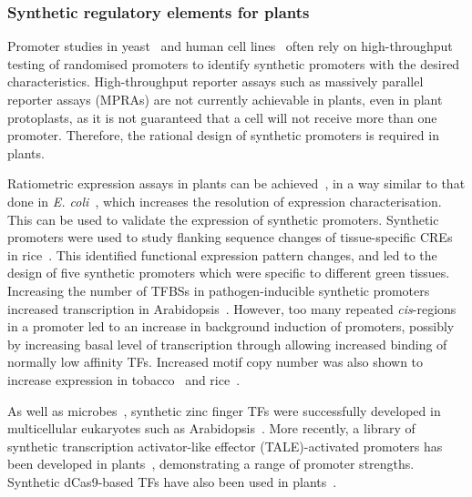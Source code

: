 \documentclass[../main.tex]{subfiles}
\begin{document}
\subsubsection{Synthetic regulatory elements for plants}\label{chapter1:synthetic-regulatory-elements-for-plants}

Promoter studies in yeast~\autocite{reddenDevelopmentCharacterizationSynthetic2015,boerDecipheringEukaryoticGeneregulatory2019,kotopkaModeldrivenGenerationArtificial2020} and human cell lines~\autocite{mattioliHighthroughputFunctionalAnalysis2019} often rely on high\hyp{}throughput testing of randomised promoters to identify synthetic promoters with the desired characteristics.
High\hyp{}throughput reporter assays such as massively parallel reporter assays (MPRAs) are not currently achievable in plants, even in plant protoplasts, as it is not guaranteed that a cell will not receive more than one promoter.
Therefore, the rational design of synthetic promoters is required in plants.

Ratiometric expression assays in plants can be achieved~\autocite{brucknerLibrarySyntheticTranscription2015}, in a way similar to that done in \textit{E. coli}~\autocite{kellyMeasuringActivityBioBrick2009}, which increases the resolution of expression characterisation.
This can be used to validate the expression of synthetic promoters.
Synthetic promoters were used to study flanking sequence changes of tissue\hyp{}specific CREs in rice~\autocite{wangNovelGreenTissuespecific2015}.
This identified functional expression pattern changes, and led to the design of five synthetic promoters which were specific to different
green tissues.
Increasing the number of TFBSs in pathogen\hyp{}inducible synthetic promoters increased transcription in Arabidopsis~\autocite{rushtonSyntheticPlantPromoters2002}.
However, too many repeated \textit{cis}\hyp{}regions in a promoter led to an increase in background induction of promoters, possibly by increasing basal level of transcription through allowing increased binding of normally low affinity TFs.
Increased motif copy number was also shown to increase expression in tobacco~\autocite{sawantVarietySynergisticAntagonistic2005} and rice~\autocite{wuGCN4MotifRice1998a}.

As well as microbes~\autocite{khalilSyntheticBiologyFramework2012}, synthetic zinc finger TFs were successfully developed in multicellular eukaryotes such as Arabidopsis~\autocite{guanHeritableEndogenousGene2002}.
More recently, a library of synthetic transcription activator\hyp{}like effector (TALE)\hyp{}activated promoters has been developed in plants~\autocite{brucknerLibrarySyntheticTranscription2015}, demonstrating a range of promoter strengths.
Synthetic dCas9-based TFs have also been used in plants~\autocite{piatekRNAguidedTranscriptionalRegulation2015}.
\end{document}
